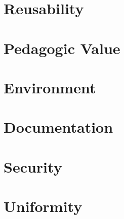 \section{Reusability}


\section{Pedagogic Value}


\section{Environment}


\section{Documentation}


\section{Security}


\section{Uniformity}

